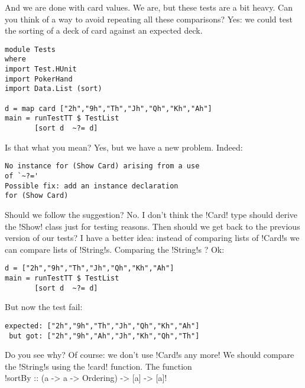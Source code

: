 \success And we are done with card values.
\lhN We are, but these tests are a bit heavy. Can you think of a way to avoid repeating all these comparisons?
\lhA Yes: we could test the sorting of a deck of card against an expected deck.
\lhN 
\begin{lstlisting}[frame=single]
module Tests
where 
import Test.HUnit
import PokerHand
import Data.List (sort)

d = map card ["2h","9h","Th","Jh","Qh","Kh","Ah"]
main = runTestTT $ TestList 
       [sort d  ~?= d]
\end{lstlisting} %
Is that what you mean?
\lhA \error Yes, but we have a new problem.
\lhN \error Indeed:
\begin{small}
\begin{verbatim}
No instance for (Show Card) arising from a use 
of `~?='
Possible fix: add an instance declaration 
for (Show Card)
\end{verbatim}
\end{small}
Should we follow the suggestion?
\lhA \error No. I don't think the \il!Card! type should derive the \il!Show! class just for testing reasons.
\lhN Then should we get back to the previous version of our tests?
\lhA I have a better idea: instead of comparing lists of \il!Card!s we can compare lists of \il!String!s.
\lhN \error Comparing the \il!String!s ? Ok:
\begin{lstlisting}[frame=single]
d = ["2h","9h","Th","Jh","Qh","Kh","Ah"]
main = runTestTT $ TestList 
       [sort d  ~?= d]
\end{lstlisting} %
\failure But now the test fail:
\begin{small}
\begin{verbatim}
expected: ["2h","9h","Th","Jh","Qh","Kh","Ah"]
 but got: ["2h","9h","Ah","Jh","Kh","Qh","Th"]
\end{verbatim}
\end{small}
Do you see why?
\lhA \failure Of course: we don't use \il!Card!s any more! We should compare the \il!String!s using the \il!card! function. The function \\

\il!sortBy :: (a -> a -> Ordering) -> [a] -> [a]! \\

